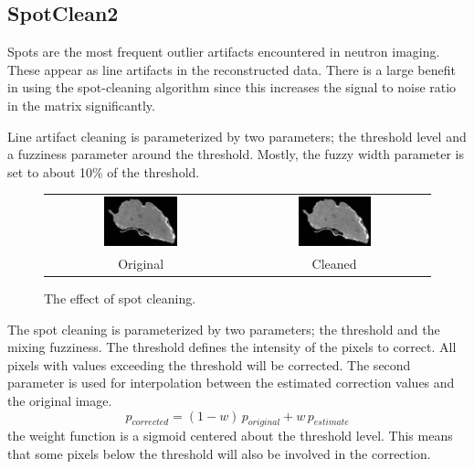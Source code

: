 \documentclass[a4paper]{scrreprt}
\begin{document}
\subsection{SpotClean2}
Spots are the most frequent outlier artifacts encountered in neutron imaging.
These appear as line artifacts in the reconstructed data. There is a large
benefit in using the spot-cleaning algorithm since this increases the signal to
noise ratio in the matrix significantly.

Line artifact cleaning is parameterized by two parameters; the threshold level
and a fuzziness parameter around the threshold. Mostly, the fuzzy width
parameter is set to about 10\% of the threshold.
\begin{figure}[ht!]
\centering
\begin{tabular}{cc}
\includegraphics[width=0.4\textwidth]{figures/lineartifact_raw.png}&
\includegraphics[width=0.4\textwidth]{figures/lineartifact_clean.png}\\
Original & Cleaned
\end{tabular}
\caption{The effect of spot cleaning.}\label{fig_spotcleaning}
\end{figure}

The spot cleaning is parameterized by two parameters; the threshold and the
mixing fuzziness. The threshold defines the intensity of the pixels to correct.
All pixels with values exceeding the threshold will be corrected. The second
parameter is used for interpolation between the estimated correction values and
the original image.
\[
p_{corrected}=(1-w)\,p_{original}+w\,p_{estimate}
\]
the weight function is a sigmoid centered about the threshold level. This means
that some pixels below the threshold will also be involved in the correction.
\end{document}
